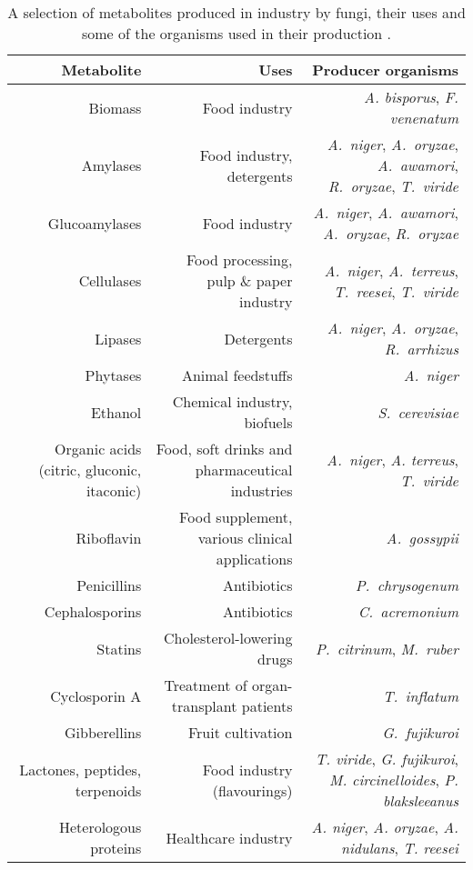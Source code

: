 \begin{table}[htbp]
	\centering
	\footnotesize
	\caption{A selection of metabolites produced in industry by fungi, their uses and some of the organisms used in their production \cite{archer2001,carlile2001,papagiannireview}.}
	\label{tab:MetaInd}
	\begin{tabularx}{(\textwidth - 1cm)}{R R R}
		\toprule
		Metabolite & Uses & Producer organisms \\ \midrule
		Biomass & Food industry & \emph{A. bisporus}, \emph{F. venenatum}\\
		Amylases & Food industry, detergents & \emph{A.~niger}, \emph{A.~oryzae}, \emph{A.~awamori}, \emph{R.~oryzae}, \emph{T.~viride}\\
		Glucoamylases & Food industry & \emph{A.~niger}, \emph{A.~awamori}, \emph{A.~oryzae}, \emph{R.~oryzae} \\
		Cellulases & Food processing, pulp \& paper industry & \emph{A.~niger}, \emph{A.~terreus}, \emph{T.~reesei}, \emph{T.~viride} \\
		Lipases & Detergents & \emph{A.~niger}, \emph{A.~oryzae}, \emph{R.~arrhizus} \\
		Phytases & Animal feedstuffs & \emph{A.~niger} \\
		Ethanol & Chemical industry, biofuels & \emph{S.~cerevisiae} \\
		Organic acids (citric, gluconic, itaconic) & Food, soft drinks and pharmaceutical industries & \emph{A.~niger}, \emph{A. terreus}, \emph{T.~viride}\\
		Riboflavin & Food supplement, various clinical applications & \emph{A.~gossypii} \\
		Penicillins & Antibiotics & \emph{P.~chrysogenum} \\
		Cephalosporins & Antibiotics  & \emph{C.~acremonium}\\
		Statins & Cholesterol-lowering drugs & \emph{P.~citrinum}, \emph{M.~ruber} \\
		Cyclosporin A & Treatment of organ-transplant patients & \emph{T.~inflatum} \\
		Gibberellins & Fruit cultivation & \emph{G.~fujikuroi} \\
		Lactones, peptides, terpenoids & Food industry (flavourings) & \emph{T. viride}, \emph{G. fujikuroi}, \emph{M. circinelloides}, \emph{P. blaksleeanus}\\
		Heterologous proteins & Healthcare industry & \emph{A. niger}, \emph{A. oryzae}, \emph{A. nidulans}, \emph{T. reesei}\\
		\bottomrule
	\end{tabularx}
\end{table}

